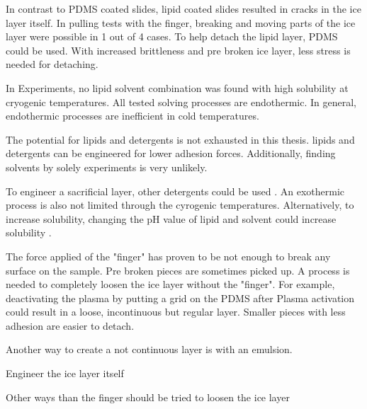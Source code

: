 In contrast to PDMS coated slides, lipid coated slides resulted in cracks in the ice layer itself. In pulling tests with the finger, breaking and moving parts of the ice layer were possible in 1 out of 4 cases. To help detach the lipid layer, PDMS could be used. With increased brittleness and pre broken ice layer, less stress is needed for detaching.


In Experiments, no lipid solvent combination was found with high solubility at cryogenic temperatures. All tested solving processes are endothermic. In general, endothermic processes are inefficient in cold temperatures.

 The potential for lipids and detergents is not exhausted in this thesis. lipids and detergents can be engineered for lower adhesion forces. Additionally, finding solvents by solely experiments is very unlikely. 

To engineer a sacrificial layer, other detergents could be used \cite{SigmaAldrich.2023}. An exothermic process is also not limited through the cyrogenic temperatures. Alternatively, to increase solubility, changing the pH value of lipid and solvent could increase solubility \cite{BruceA.AverillPatriciaEldredge.}.


The force applied of the "finger" has proven to be not enough to break any surface on the sample. Pre broken pieces are sometimes picked up. A process is needed to completely loosen the ice layer without the "finger". For example, deactivating the plasma by putting a grid on the PDMS after Plasma activation could result in a loose, incontinuous but regular layer. Smaller pieces with less adhesion are easier to detach.

Another way to create a not continuous layer is with an emulsion. 

Engineer the ice layer itself

Other ways than the finger should be tried to loosen the ice layer
